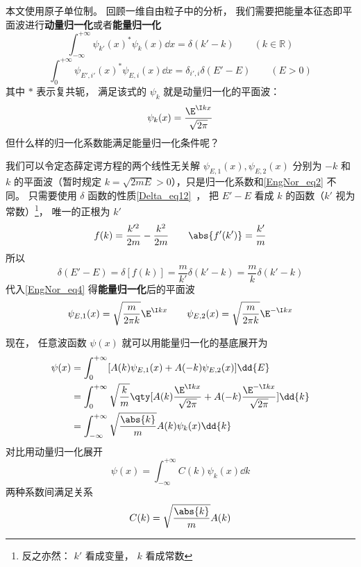 

本文使用原子单位制。 回顾一维自由粒子中的分析， 我们需要把能量本征态即平面波进行\textbf{动量归一化}或者\textbf{能量归一化}%
\begin{equation}\label{EngNor_eq1}
\int_{-\infty}^{+\infty} \psi_{k'}(x)^* \psi_{k}(x) \dd{x} = \delta(k' - k) \qquad (k \in \mathbb R)
\end{equation}
\begin{equation}\label{EngNor_eq4}
\int_{0}^{+\infty} \psi_{E',i'}(x)^* \psi_{E,i}(x) \dd{x} = \delta_{i',i}\delta(E' - E) \qquad (E > 0)
\end{equation}
其中 $*$ 表示复共轭， 满足该式的 $\psi_k$ 就是动量归一化的平面波：%
\begin{equation}\label{EngNor_eq2}
\psi_k(x) = \frac{\E^{\I kx}}{\sqrt{2\pi}}
\end{equation}
但什么样的归一化系数能满足能量归一化条件呢？

我们可以令定态薛定谔方程的两个线性无关解 $\psi_{E,1}(x), \psi_{E,2}(x)$ 分别为 $-k$ 和 $k$ 的平面波（暂时规定 $k = \sqrt{2mE} > 0$），只是归一化系数和\autoref{EngNor_eq2} 不同。 只需要使用 $\delta$ 函数的性质\autoref{Delta_eq12}~， 把 $E'-E$ 看成 $k$ 的函数（$k'$ 视为常数）\footnote{反之亦然： $k'$ 看成变量， $k$ 看成常数}， 唯一的正根为 $k'$
\begin{equation}
f(k) = \frac{k'^2}{2m} - \frac{k^2}{2m}
\qquad
\abs{f'(k')} = \frac{k'}{m}
\end{equation}
所以
\begin{equation}
\delta(E'-E) = \delta[f(k)] = \frac{m}{k'} \delta(k'-k) = \frac{m}{k} \delta(k'-k)
\end{equation}
代入\autoref{EngNor_eq4} 得\textbf{能量归一化}后的平面波
\begin{equation}
\psi_{E,1}(x) = \sqrt{\frac{m}{2\pi k}}\E^{\I kx}
\qquad
\psi_{E,2}(x) = \sqrt{\frac{m}{2\pi k}}\E^{-\I kx}
\end{equation}

现在， 任意波函数 $\psi(x)$ 就可以用能量归一化的基底展开为%
\begin{equation}
\begin{aligned}
\psi(x) &= \int_0^{+\infty} [A(k) \psi_{E,1}(x) + A(-k) \psi_{E,2}(x)] \dd{E}\\
&= \int_0^{+\infty} \sqrt{\frac{k}{m}}\qty[A(k) \frac{\E^{\I kx}}{\sqrt{2\pi}} + A(-k)\frac{\E^{-\I kx}}{\sqrt{2\pi}}]\dd{k}\\
&= \int_{-\infty}^{+\infty} \sqrt{\frac{\abs{k}}{m}}A(k) \psi_k(x) \dd{k}
\end{aligned}
\end{equation}
对比用动量归一化展开
\begin{equation}
\psi(x) = \int_{-\infty}^{+\infty} C(k)\psi_k(x) \dd{k}
\end{equation}
两种系数间满足关系
\begin{equation}
C(k) = \sqrt{\frac{\abs{k}}{m}}A(k)
\end{equation}

